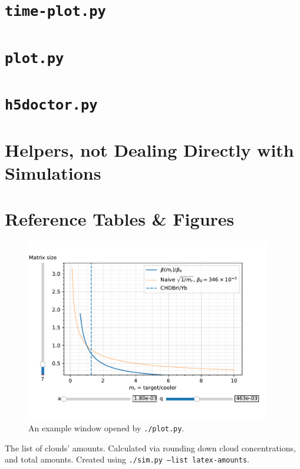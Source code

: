 \section{\texttt{time-plot.py}}

\section{\texttt{plot.py}}\label{sec:manual/plot}

\section{\texttt{h5doctor.py}}

\section{Helpers, not Dealing Directly with Simulations}

\section{Reference Tables \& Figures}

\begin{figure}[h]
	\begin{center}
		\includegraphics[width=0.95\textwidth]{graphics/software-plot-example.pdf}
	\end{center}
	\caption{An example window opened by \texttt{./plot.py}.}
	\label{fig:software-plot-example}
\end{figure}

\begin{table}[h]

\caption{The list of clouds' amounts. Calculated via rounding down cloud concentrations, and total amounts. Created using \texttt{./sim.py --list latex-amounts}.}
\label{tbl:sim-list-amounts}
\end{table}



